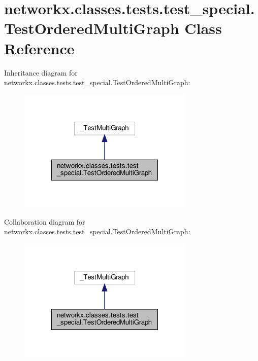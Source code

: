 \hypertarget{classnetworkx_1_1classes_1_1tests_1_1test__special_1_1TestOrderedMultiGraph}{}\section{networkx.\+classes.\+tests.\+test\+\_\+special.\+Test\+Ordered\+Multi\+Graph Class Reference}
\label{classnetworkx_1_1classes_1_1tests_1_1test__special_1_1TestOrderedMultiGraph}


Inheritance diagram for networkx.\+classes.\+tests.\+test\+\_\+special.\+Test\+Ordered\+Multi\+Graph\+:
\nopagebreak
\begin{figure}[H]
\begin{center}
\leavevmode
\includegraphics[width=237pt]{classnetworkx_1_1classes_1_1tests_1_1test__special_1_1TestOrderedMultiGraph__inherit__graph}
\end{center}
\end{figure}


Collaboration diagram for networkx.\+classes.\+tests.\+test\+\_\+special.\+Test\+Ordered\+Multi\+Graph\+:
\nopagebreak
\begin{figure}[H]
\begin{center}
\leavevmode
\includegraphics[width=237pt]{classnetworkx_1_1classes_1_1tests_1_1test__special_1_1TestOrderedMultiGraph__coll__graph}
\end{center}
\end{figure}
